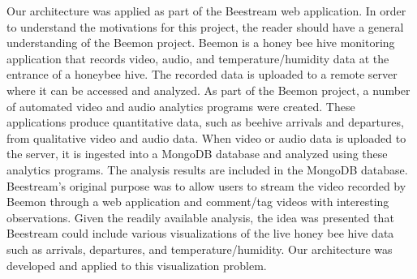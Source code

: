 %
%

	Our architecture was applied as part of the Beestream web application.  In order to understand the motivations for this project, the reader should have a general understanding of the Beemon project.  Beemon is a honey bee hive monitoring application that records video, audio, and temperature/humidity data at the entrance of a honeybee hive.  The recorded data is uploaded to a remote server where it can be accessed and analyzed.  As part of the Beemon project, a number of automated video and audio analytics programs were created.  These applications produce quantitative data, such as beehive arrivals and departures, from qualitative video and audio data.  When video or audio data is uploaded to the server, it is ingested into a MongoDB database and analyzed using these analytics programs.  The analysis results are included in the MongoDB database.  Beestream’s original purpose was to allow users to stream the video recorded by Beemon through a web application and comment/tag videos with interesting observations.  Given the readily available analysis, the idea was presented that Beestream could include various visualizations of the live honey bee hive data such as arrivals, departures, and temperature/humidity.  Our architecture was developed and applied to this visualization problem. \par
